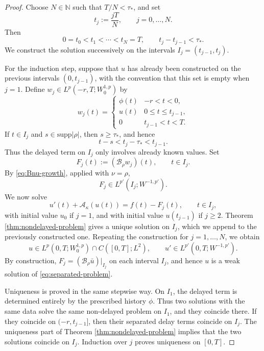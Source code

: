 \documentclass[a4paper,11pt,oneside,reqno]{amsart}
\newcounter{c}
\newcounter{d}
\newcounter{b}
\newcommand{\supp}{\mathrm{supp}}
\begin{document}
\begin{proof}
Choose \(N\in\mathbb N\) such that \(T/N<\tau_*\), and set
\[
 t_j:=\frac{jT}{N},\qquad j=0,\dots,N.
\]
Then
\[
 0=t_0<t_1<\cdots<t_N=T,
 \qquad
 t_j-t_{j-1}<\tau_* .
\]
We construct the solution successively on the intervals \(I_j=(t_{j-1},t_j)\).

For the induction step, suppose that \(u\) has already been constructed on
the previous intervals \((0,t_{j-1})\), with the convention that this set is
empty when \(j=1\). Define \(w_j\in L^p(-r,T;W^{1,p}_0)\) by
\[
 w_j(t)=
 \begin{cases}
  \phi(t) & -r<t<0,\\
  u(t)   & 0\le t \le t_{j-1},\\
  0      & t_{j-1}<t<T.
 \end{cases}
\]
If \(t\in I_j\) and
\(s\in\supp|\rho|\), then \(s\ge\tau_*\), and hence
\[
 t-s<t_j-\tau_*<t_{j-1}.
\]
Thus the delayed term on \(I_j\) only involves already known values.  Set
\[
 F_j(t):=(\mathcal B_\rho w_j)(t),
 \qquad t\in I_j.
\]
By \eqref{eq:Bnu-growth}, applied with \(\nu=\rho\),
\[
 F_j\in L^{p'}(I_j;W^{-1,p'}).
\]
We now solve
\begin{equation}
 u'(t)+\mathcal A_\kappa(u(t))=f(t)-F_j(t),
 \qquad t\in I_j,
 \label{eq:step-problem}
\end{equation}
with initial value \(u_0\) if \(j=1\), and with initial value
\(u(t_{j-1})\) if \(j\ge2\). Theorem
\ref{thm:nondelayed-problem} gives a unique solution on \(I_j\), which we
append to the previously constructed one.
Repeating the construction for \(j=1,\dots,N\), we obtain
\[
 u\in L^p(0,T;W^{1,p}_0)\cap C([0,T];L^2),
 \qquad
 u'\in L^{p'}(0,T;W^{-1,p'}).
\]
By construction, \(F_j=(\mathcal B_\rho\bar u)|_{I_j}\) on each interval
\(I_j\), and hence \(u\) is a weak solution of
\eqref{eq:separated-problem}.

Uniqueness is proved in the same stepwise way. On \(I_1\), the delayed
term is determined entirely by the prescribed history \(\phi\). Thus two
solutions with the same data solve the same non-delayed problem on \(I_1\),
and they coincide there. If they coincide on \((-r,t_{j-1}]\), then their
separated delay terms coincide on \(I_j\). The uniqueness part of Theorem
\ref{thm:nondelayed-problem} implies that the two solutions coincide on
\(I_j\). Induction over \(j\) proves uniqueness on \([0,T]\).


\end{proof}
\end{document}
